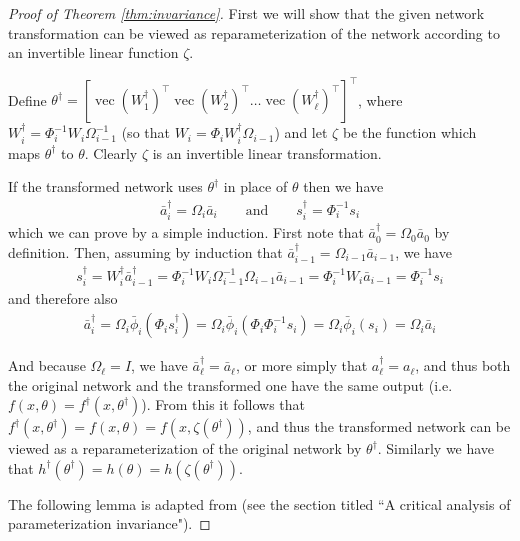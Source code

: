 \documentclass[12pt]{article}
\newcommand{\nonlin}{\phi}
\newcommand{\ovec}{\operatorname{vec}}
\begin{document}
\begin{proof}[Proof of Theorem \ref{thm:invariance}]

First we will show that the given network transformation can be viewed as reparameterization of the network according to an invertible linear function $\zeta$.  

Define $\theta^\dagger = [ \ovec(W^\dagger_1)^\top \ovec(W^\dagger_2)^\top \dots \ovec(W^\dagger_\ell)^\top ]^\top$, where $W^\dagger_i = \Phi_i^{-1} W_i \Omega_{i-1}^{-1}$ (so that $W_i = \Phi_i W^\dagger_i \Omega_{i-1}$) and let $\zeta$ be the function which maps $\theta^\dagger$ to $\theta$.  Clearly $\zeta$ is an invertible linear transformation.  

If the transformed network uses $\theta^\dagger$ in place of $\theta$ then we have 
\begin{align*}
\bar{a}^\dagger_i = \Omega_i \bar{a}_i \quad \quad \mbox{and} \quad \quad s^\dagger_i = \Phi_i^{-1} s_i
\end{align*}
which we can prove by a simple induction.  First note that $\bar{a}^\dagger_0 = \Omega_0 \bar{a}_0$ by definition.  Then, assuming by induction that $\bar{a}^\dagger_{i-1} = \Omega_{i-1} \bar{a}_{i-1}$, we have
\begin{align*}
s^\dagger_i = W^\dagger_i \bar{a}^\dagger_{i-1} = \Phi_i^{-1} W_i \Omega_{i-1}^{-1} \Omega_{i-1} \bar{a}_{i-1} = \Phi_i^{-1} W_i \bar{a}_{i-1} = \Phi_i^{-1} s_i
\end{align*}
and therefore also
\begin{align*}
\bar{a}^\dagger_i = \Omega_i \bar{\nonlin}_i( \Phi_i s^\dagger_i ) = \Omega_i \bar{\nonlin}_i( \Phi_i \Phi_i^{-1} s_i ) = \Omega_i \bar{\nonlin}_i( s_i ) = \Omega_i \bar{a}_i
\end{align*}

And because $\Omega_\ell = I$, we have $\bar{a}^\dagger_\ell = \bar{a}_\ell$, or more simply that $a^\dagger_\ell = a_\ell$, and thus both the original network and the transformed one have the same output (i.e. $f(x,\theta) = f^\dagger(x,\theta^\dagger)$). %
From this it follows that $f^\dagger(x,\theta^\dagger) = f(x,\theta) = f(x,\zeta(\theta^\dagger))$, and thus the transformed network can be viewed as a reparameterization of the original network by $\theta^\dagger$.  Similarly we have that $h^\dagger(\theta^\dagger) = h(\theta) = h(\zeta(\theta^\dagger))$.

The following lemma is adapted from \citet{ng_martens} (see the section titled ``A critical analysis of parameterization invariance").


\end{proof}
\end{document}
